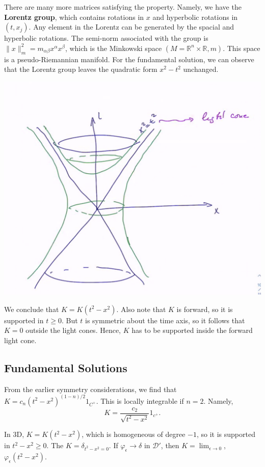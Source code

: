 \documentclass[11pt]{scrartcl}
\newcommand{\R}{\mathbb{R}}
\let \phi \varphi
\begin{document}
There are many more matrices satisfying the property.  Namely, we have the \textbf{Lorentz group}, which contains rotations in $x$ and hyperbolic rotations in $(t, x_j)$.  Any element in the Lorentz can be generated by the spacial and hyperbolic rotations.  The semi-norm associated with the group is $\|x\|_m^2 = m_{\alpha \beta} x^\alpha x^\beta$, which is the Minkowski space $(M = \R^n \times \R, m)$.  This space is a pseudo-Riemannian manifold.  For the fundamental solution, we can observe that the Lorentz group leaves the quadratic form $x^2 - t^2$ unchanged.  
\begin{center}
\includegraphics[scale=0.5]{minkSpace.png}
\end{center}
We conclude that $K = K(t^2 - x^2)$.  Also note that $K$ is forward, so it is supported in $t \ge 0$.  But $t$ is symmetric about the time axis, so it follows that $K = 0$ outside the light cones.  Hence, $K$ has to be supported inside the forward light cone.  
\subsection{Fundamental Solutions}
From the earlier symmetry considerations, we find that $K = c_n (t^2 - x^2)^{(1-n)/2} 1_{C^+}$.  This is locally integrable if $n = 2$.  
Namely,
$$K = \frac{c_2}{\sqrt{t^2 - x^2}}1_{c^+}.$$

In 3D, $K = K(t^2 - x^2)$, which is homogeneous of degree $-1$, so it is supported in $t^2 - x^2 \ge 0$.
The $K = \delta_{t^2 - x^2 = 0}$.  If $\phi_\epsilon \to \delta$ in $\mathcal D'$, then $K = \lim_{\epsilon \to 0}$, $\phi_\epsilon(t^2 - x^2)$.
\end{document}

